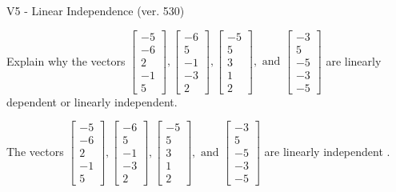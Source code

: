 \begin{exercise}
  \begin{exerciseTitle}V5 - Linear Independence (ver. 530)\end{exerciseTitle}
  \begin{exerciseStatement}
    Explain why the vectors \(\left[\begin{array}{r}
-5 \\
-6 \\
2 \\
-1 \\
5
\end{array}\right] , \left[\begin{array}{r}
-6 \\
5 \\
-1 \\
-3 \\
2
\end{array}\right] , \left[\begin{array}{r}
-5 \\
5 \\
3 \\
1 \\
2
\end{array}\right] , \text{ and } \left[\begin{array}{r}
-3 \\
5 \\
-5 \\
-3 \\
-5
\end{array}\right]\) are linearly dependent or linearly independent.	


  \end{exerciseStatement}
  \begin{exerciseAnswer}
   The vectors \(\left[\begin{array}{r}
-5 \\
-6 \\
2 \\
-1 \\
5
\end{array}\right] , \left[\begin{array}{r}
-6 \\
5 \\
-1 \\
-3 \\
2
\end{array}\right] , \left[\begin{array}{r}
-5 \\
5 \\
3 \\
1 \\
2
\end{array}\right] , \text{ and } \left[\begin{array}{r}
-3 \\
5 \\
-5 \\
-3 \\
-5
\end{array}\right]\) are 
  	 linearly independent  .
  


  \end{exerciseAnswer}
\end{exercise}
